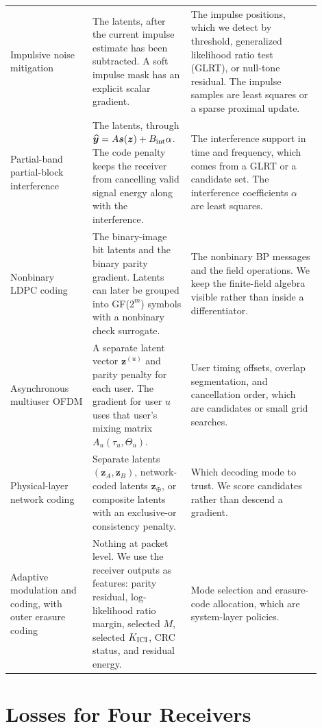\documentclass[11pt]{article}
\begin{document}
\begin{longtable}{@{}>{\raggedright\arraybackslash}p{0.24\linewidth}>{\raggedright\arraybackslash}p{0.28\linewidth}>{\raggedright\arraybackslash}p{0.38\linewidth}@{}}
Impulsive noise mitigation
& The latents, after the current impulse estimate has been subtracted.  A soft
impulse mask has an explicit scalar gradient.
& The impulse positions, which we detect by threshold, generalized likelihood
ratio test (GLRT), or null-tone residual.  The impulse samples are least squares
or a sparse proximal update. \\

Partial-band partial-block interference
& The latents, through
$\widehat{\bm y}=A\bm s(\bm z)+B_{\rm int}\alpha$.  The code penalty keeps the
receiver from cancelling valid signal energy along with the interference.
& The interference support in time and frequency, which comes from a GLRT or a
candidate set.  The interference coefficients $\alpha$ are least squares. \\

Nonbinary LDPC coding
& The binary-image bit latents and the binary parity gradient.  Latents can
later be grouped into GF($2^m$) symbols with a nonbinary check surrogate.
& The nonbinary BP messages and the field operations.  We keep the finite-field
algebra visible rather than inside a differentiator. \\

Asynchronous multiuser OFDM
& A separate latent vector $\bm z^{(u)}$ and parity penalty for each user.  The
gradient for user $u$ uses that user's mixing matrix $A_u(\tau_u,\Theta_u)$.
& User timing offsets, overlap segmentation, and cancellation order, which are
candidates or small grid searches. \\

Physical-layer network coding
& Separate latents $(\bm z_A,\bm z_B)$, network-coded latents $\bm z_\oplus$, or
composite latents with an exclusive-or consistency penalty.
& Which decoding mode to trust.  We score candidates rather than descend a
gradient. \\

Adaptive modulation and coding, with outer erasure coding
& Nothing at packet level.  We use the receiver outputs as features: parity
residual, log-likelihood ratio margin, selected $M$, selected $K_{\rm ICI}$, CRC
status, and residual energy.
& Mode selection and erasure-code allocation, which are system-layer policies. \\
\bottomrule
\end{longtable}

\section{Losses for Four Receivers}
\end{document}
